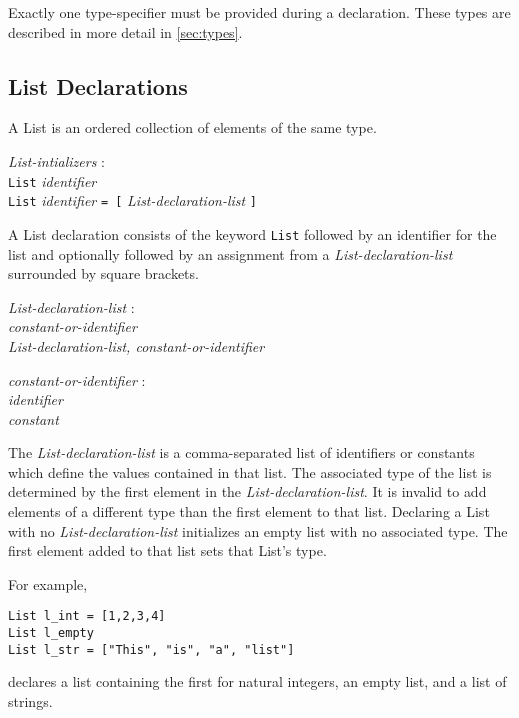 \documentclass{article}
\begin{document}
Exactly one type-specifier must be provided during a declaration. These types are described in more detail in \ref{sec:types}.

\subsection{List Declarations}
A List is an ordered collection of elements of the same type. 
\begin{tabbing}
	\= \emph{List}\=\emph{-intializers} : \\
		\> \> \texttt{List} \emph{identifier} \\
		\>\> \texttt{List} \emph{identifier} \texttt{= [} \emph{List-declaration-list } \texttt{]} 
\end{tabbing}
A List declaration consists of the keyword \texttt{List} followed by an identifier for the list and optionally followed by an assignment from a \emph{List-declaration-list} surrounded by square brackets.

\begin{tabbing}
	\= \emph{List}\=\emph{-declaration-list} : \\
		\> \> \emph{constant-or-identifier} \\
		\>\> \emph{List-declaration-list, constant-or-identifier}
\end{tabbing}
\begin{tabbing}
	\= \emph{const}\=\emph{ant-or-identifier} : \\
		\> \> \emph{identifier} \\
		\>\> \emph{constant}
\end{tabbing}

The \emph{List-declaration-list} is a comma-separated list of identifiers or constants which define the values contained in that list. The associated type of the list is determined by the first element in the \emph{List-declaration-list}. It is invalid to add elements of a different type than the first element to that list. Declaring a List with no \emph{List-declaration-list} initializes an empty list with no associated type. The first element added to that list sets that List's type. 

For example,
\begin{lstlisting}
List l_int = [1,2,3,4]
List l_empty
List l_str = ["This", "is", "a", "list"]
\end{lstlisting}
declares a list containing the first for natural integers, an empty list, and a list of strings.
\end{document}
